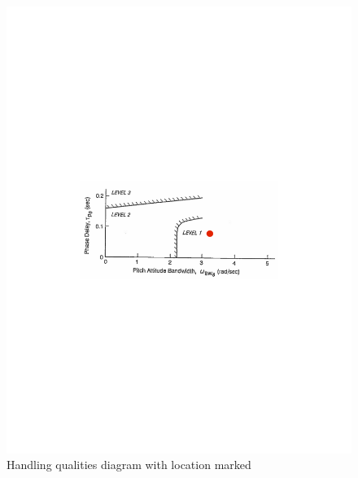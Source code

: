 \documentclass[12pt]{article}
\begin{document}
\begin{figure}[h!]
\begin{center}
\includegraphics[height=.2\textheight]{figures/handling_marked}
\caption{Handling qualities diagram with location marked}
\end{center}
\end{figure}
\end{document}
